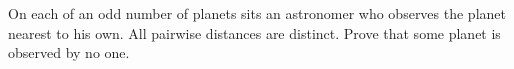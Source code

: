 On each of an odd number of planets sits an astronomer who observes the planet nearest to his own. All pairwise distances are distinct. Prove that some planet is observed by no one.
